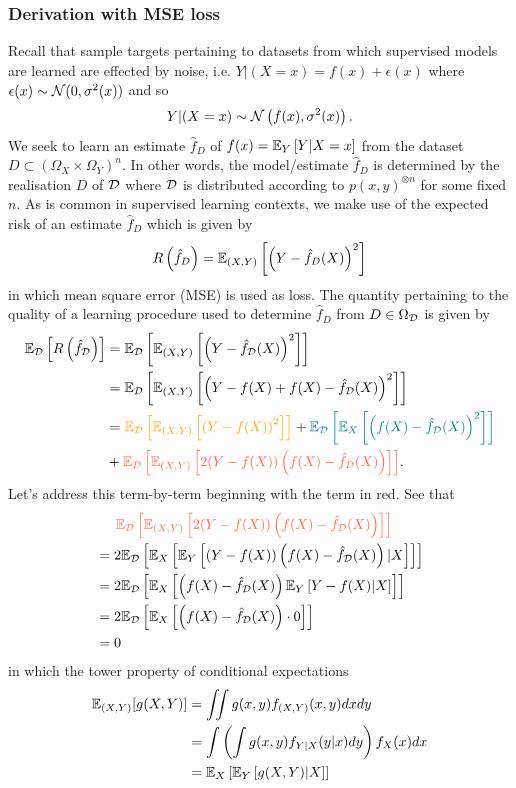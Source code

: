 \documentclass[11pt]{article}
\begin{document}
\subsubsection{Derivation with MSE loss}
Recall that sample targets pertaining to datasets from which supervised models are learned are effected by noise, i.e. $Y|(X=x)=f(x)+\epsilon(x)$ where $\epsilon(x)\sim\mathcal{N}(0,\sigma^2(x))$ and so
$$
Y|(X=x)
\sim
\mathcal{N}\left(f(x), \sigma^2(x)\right).
$$
We seek to learn an estimate $\hat{f}_{D}$ of $f(x)=\mathbb{E}_Y\left[Y|X=x\right]$ from the dataset $D\subset(\Omega_X\times\Omega_Y)^n$. In other words, the model/estimate $\hat{f}_{D}$ is determined by the realisation $D$ of $\mathcal{D}$ where $\mathcal{D}$ is distributed according to $p(x,y)^{\otimes n}$ for some fixed $n$. As is common in supervised learning contexts, we make use of the expected risk of an estimate $\hat{f}_D$ which is given by
$$
R\left(\hat{f}_D\right)
=
\mathbb{E}_{(X,Y)}\left[\left(Y-\hat{f}_D(X)\right)^2\right]
$$
in which mean square error (MSE) is used as loss. The quantity pertaining to the quality of a learning procedure used to determine $\hat{f}_{D}$ from $D\in\Omega_{\mathcal{D}}$ is given by
\begin{align*}
    \E_{\D}\l[R\l(\hat{f}_{\D}\r)\r]
    &=
    \E_{\D}\l[\E_{(X,Y)}\l[\l(Y-\hat{f}_{\D}(X)\r)^2\r]\r]\nonumber\\
    &=
    \E_{\D}\l[\E_{(X,Y)}\l[\l(Y-f(X)+f(X)-\hat{f}_{\D}(X)\r)^2\r]\r]\nonumber\\
    &=
    \textcolor{c5}{\E_{\D}\l[\E_{(X,Y)}\l[\l(Y-f(X)\r)^2\r]\r]}+
    \textcolor{c11}{\E_{\D}\l[\E_X\l[\l(f(X)-\hat{f}_{\D}(X)\r)^2\r]\r]}\\
    &+\textcolor{c3}{\E_{\D}\l[\E_{(X,Y)}\l[2(Y-f(X))\l(f(X)-\hat{f}_{\D}(X)\r)\r]\r]}.
\end{align*}
Let's address this term-by-term beginning with the term in red. See that
\begin{align*}
    &\hspace{14.52pt}
    \textcolor{c3}{\E_{\D}\l[\E_{(X,Y)}\l[2(Y-f(X))\l(f(X)-\hat{f}_{\D}(X)\r)\r]\r]}\\
    &=
    2\E_{\D}\l[\E_X\l[\E_{Y}\l[(Y-f(X))\l(f(X)-\hat{f}_{\D}(X)\r)|X\r]\r]\r]\\
    &=
    2\E_{\D}\l[\E_X\l[\l(f(X)-\hat{f}_{\D}(X)\r)\E_{Y}\l[Y-f(X)|X\r]\r]\r]\\
    &=
    2\E_{\D}\l[\E_X\l[\l(f(X)-\hat{f}_{\D}(X)\r)\cdot0\r]\r]\\
    &=
    0
\end{align*}
in which the tower property of conditional expectations
\begin{align*}
    \mathbb{E}_{(X,Y)}[g(X,Y)]
    &=
    \iint g(x,y)f_{(X,Y)}(x,y)dxdy\\
    &=
    \int \left(\int g(x,y)f_{Y|X}(y|x)dy\right)f_X(x)dx\\
    &=
    \mathbb{E}_X\left[\mathbb{E}_Y\left[g(X,Y)|X\right]\right]
\end{align*}
\end{document}
